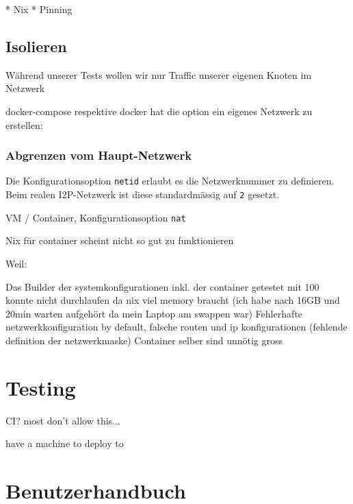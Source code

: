 * Nix
* Pinning
    
\cite{noauthor_nixops_nodate-5}


\subsection{Isolieren}

Während unserer Tests wollen wir nur Traffic unserer eigenen Knoten im Netzwerk 

docker-compose respektive docker hat die option ein eigenes Netzwerk zu erstellen:

\subsubsection{Abgrenzen vom Haupt-Netzwerk}

Die Konfigurationsoption \lstinline|netid| erlaubt es die Netzwerknummer zu definieren.
Beim realen I2P-Netzwerk ist diese standardmässig auf \lstinline|2| gesetzt.

VM / Container, Konfigurationsoption \lstinline|nat|

Nix für container scheint nicht so gut zu funktionieren

Weil:

Das Builder der systemkonfigurationen inkl. der container getestet mit 100 konnte nicht durchlaufen da nix viel memory braucht (ich habe nach 16GB und 20min warten aufgehört da mein Laptop am swappen war)
Fehlerhafte netzwerkkonfiguration by default, falsche routen und ip konfigurationen (fehlende definition der netzwerkmaske)
Container selber sind unnötig gross

\section{Testing}

CI? most don't allow this...

have a machine to deploy to

\section{Benutzerhandbuch}


